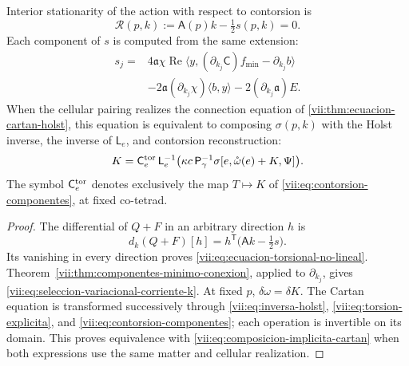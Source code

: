 \begin{proposition}
\label{vii:prop:ecuacion-torsional-no-lineal}
Interior stationarity of the action with respect to contorsion is
\begin{equation}
 \mathcal R(p,k):=\mathsf A(p)k-\tfrac12s(p,k)=0.
 \label{vii:eq:ecuacion-torsional-no-lineal}
\end{equation}
Each component of \(s\) is computed from the same extension:
\begin{equation}
 \begin{split}
 s_j={}&4\mathfrak a\chi\operatorname{Re}
       \langle y,(\partial_{k_j}\mathsf C)f_{\min}
                         -\partial_{k_j}b\rangle\\
 &-2\mathfrak a(\partial_{k_j}\chi)\langle b,y\rangle
       -2(\partial_{k_j}\mathfrak a)E.
 \end{split}
 \label{vii:eq:seleccion-variacional-corriente-k}
\end{equation}
When the cellular pairing realizes the connection equation of
\ref{vii:thm:ecuacion-cartan-holst}, this equation is equivalent
to composing \(\sigma(p,k)\) with the Holst inverse, the
inverse of \(\mathsf L_e\), and contorsion reconstruction:
\begin{equation}
 K=\mathsf C_e^{\rm tor}\,\mathsf L_e^{-1}
           \bigl(\kappa c\,\mathsf P_\gamma^{-1}
             \sigma[e,\mathring\omega(e)+K,\Psi]\bigr).
 \label{vii:eq:composicion-implicita-cartan}
\end{equation}
The symbol \(\mathsf C_e^{\rm tor}\) denotes exclusively the
map \(T\mapsto K\) of
\eqref{vii:eq:contorsion-componentes}, at fixed co-tetrad.
\end{proposition}

\begin{proof}
The differential of \(Q+F\) in an arbitrary direction \(h\) is
\[
 d_k(Q+F)[h]
   =h^{\mathsf T}\bigl(\mathsf A k-\tfrac12s\bigr).
\]
Its vanishing in every direction proves
\eqref{vii:eq:ecuacion-torsional-no-lineal}.
Theorem~\ref{vii:thm:componentes-minimo-conexion}, applied to
\(\partial_{k_j}\), gives
\eqref{vii:eq:seleccion-variacional-corriente-k}. At fixed \(p\),
\(\delta\omega=\delta K\). The Cartan equation is transformed
successively through \eqref{vii:eq:inversa-holst},
\eqref{vii:eq:torsion-explicita}, and
\eqref{vii:eq:contorsion-componentes}; each operation is invertible
on its domain. This proves equivalence with
\eqref{vii:eq:composicion-implicita-cartan} when both expressions
use the same matter and cellular realization.
\end{proof}

